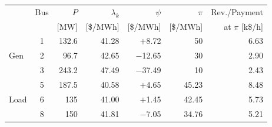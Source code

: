 \begin{table}[!tb]
\centering
\label{tab:prices_9bus}
\footnotesize
\setlength{\tabcolsep}{4pt}
\newcommand{\rowhl}[1]{\cellcolor{gray!25}#1}
\begin{tabular}{lcrrrrr}
\toprule
 & Bus & $P$ & $\lambda_k$ & $\psi$ & $\pi$ & Rev./Payment \\
 &  & [MW] & [\$/MWh] & [\$/MWh] & [\$/MWh] & at $\pi$ [k\$/h] \\
\midrule
\multirow{3}{*}{Gen} & \rowhl{1} & \rowhl{132.6} & \rowhl{41.28} & \rowhl{$+$8.72} & \rowhl{50} & \rowhl{6.63} \\
 & 2 & 96.7 & 42.65 & $-$12.65 & 30 & 2.90 \\
 & 3 & 243.2 & 47.49 & $-$37.49 & 10 & 2.43 \\
\midrule
\multirow{3}{*}{Load} & 5 & 187.5 & 40.58 & $+$4.65 & 45.23 & 8.48 \\
 & 6 & 135 & 41.00 & $+$1.45 & 42.45 & 5.73 \\
 & \rowhl{8} & \rowhl{150} & \rowhl{41.81} & \rowhl{$-$7.05} & \rowhl{34.76} & \rowhl{5.21} \\
\bottomrule
\end{tabular}
\end{table}

